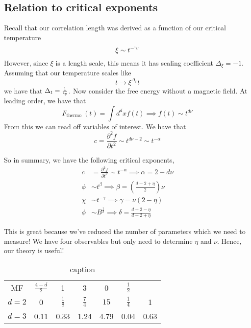 \subsection{Relation to critical exponents} 
Recall that our correlation length 
was derived as a function of our critical temperature 
\[
 \xi \sim t ^{  - `v }
\] However, since $ \xi $ is a length scale, this 
means it has scaling coefficient $ \Delta_\xi = - 1$. 
Assuming that our temperature scales like 
 \[
 t \to \xi^{ \Delta_t } t
\] we have that $ \Delta_t = \frac{1}{`v }$. 
Now consider the free energy without a magnetic field. 
At leading order, we have that 
\[
	F_{ \text{thermo } } ( t)  = \int d^ d x f( t) \implies f( t)  \sim t ^{ d \nu }
\] From this we can read off variables of interest. 
We have that 
\[
 c = \frac{\partial ^ 2 f }{\partial  t ^ 2 }  \sim t ^{ d \nu - 2 } \sim t ^{ - \alpha }
\]

So in summary, we have the following 
critical exponents, 
\begin{align*}
	c &=  \frac{\partial  ^ 2 f }{\partial   t^ 2 } \sim t ^{ - \alpha } \implies \alpha = 2 - d \nu  \\
	\phi  & \sim t ^ \beta \implies \beta = \left(  \frac{ d - 2 + \eta }{2} \right) \nu    \\
	\chi & \sim t ^{ - \gamma } \implies \gamma = \nu ( 2 - \eta ) \\
	\phi & \sim B ^{ \frac{1}{ \delta } } \implies \delta = \frac{ d + 2 - \eta }{ d - 2 + \eta }
\end{align*}

This is great because we've reduced the 
number of parameters which we need to measure! We have 
four observables but only need to determine $ \eta $ and $ \nu $. 
Hence, 
our theory is useful!

\begin{table}[htpb]
	\centering
	\caption{caption}
	\label{tab:label}
	\begin{tabular}{c | c c c c c c }
		MF & $ \frac{ 4 - d }{ 2 } $ & 1 & 3 & 0 & $\frac{1}{2 } $ \\
		$ d =  2 $ & 0  & $ \frac{1}{8 } $  & $ \frac{7}{4 } $ &  $ 15 $ & $\frac{1}{4 } $ & 1 \\
		$ d = 3 $ & 0.11 & 0.33 & 1.24 & 4.79 & 0.04 & 0.63 \\ 
	\end{tabular}
\end{table}


